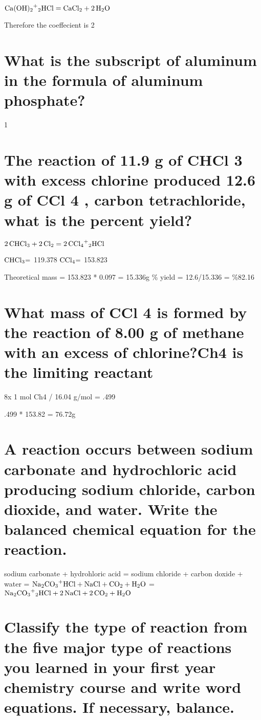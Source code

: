 \documentclass{scrartcl}
\begin{document}
\(\ce{Ca(OH)2+2HCl}=\ce{CaCl2 + 2H2O}\)

Therefore the coeffecient is 2

\section{What is the subscript of aluminum in the formula of aluminum phosphate?}
\label{sec:org61df2ec}
1

\section{The reaction of 11.9 g of CHCl 3 with excess chlorine produced 12.6 g of CCl 4 , carbon tetrachloride, what is the percent yield?}
\label{sec:org324fdd4}

\(\ce{2CHCl3 + 2Cl2}=\ce{2CCl4+2HCl}\)

\(\ce{CHCl3=}\) 119.378
\(\ce{CCl4=}\) 153.823

Theoretical mass = 153.823 * 0.097 = 15.336g
\% yield = 12.6/15.336 = \%82.16

\section{What mass of CCl 4 is formed by the reaction of 8.00 g of methane with an excess of chlorine?Ch4 is the limiting reactant}
\label{sec:org38cb5b0}

8x 1 mol Ch4 / 16.04 g/mol = .499

.499 * 153.82 = 76.72g

\section{A reaction occurs between sodium carbonate and hydrochloric acid producing sodium chloride, carbon dioxide, and water. Write the balanced chemical equation for the reaction.}
\label{sec:orgf1d6d9d}

sodium carbonate + hydrohloric acid = sodium chloride + carbon doxide + water
= \(\ce{Na2CO3+HCl}+\ce{NaCl + CO2 + H2O}\)
= \(\ce{Na2CO3+2HCl}+\ce{2NaCl + 2CO2 + H2O}\)

\section{Classify the type of reaction from the five major type of reactions you learned in your first year chemistry course and write word equations. If necessary, balance.}
\label{sec:orgf260c5d}
\end{document}
